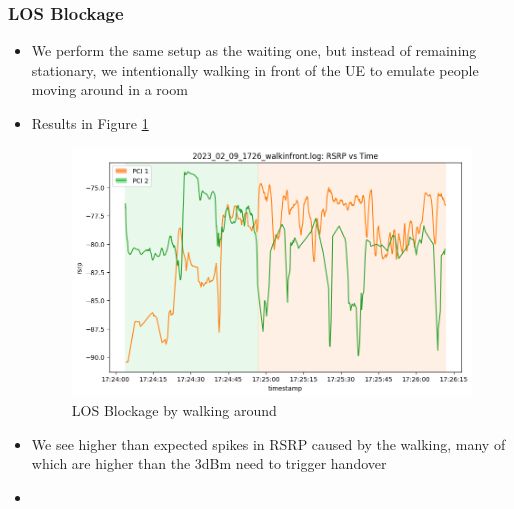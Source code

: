 \subsubsection{LOS Blockage}
\begin{itemize}
    \item We perform the same setup as the waiting one, but instead of remaining stationary, we intentionally walking in front of the UE to emulate people moving around in a room
    \item Results in Figure \ref{fig:methods:2024-02-09-walking}
\begin{figure}
    \centering
    \includegraphics[width=0.75\linewidth]{src//img/2024_02_09_los_block.png}
    \caption{LOS Blockage by walking around}
    \label{fig:methods:2024-02-09-walking}
\end{figure}

\item We see higher than expected spikes in RSRP caused by the walking, many of which are higher than the 3dBm need to trigger handover
\item \end{itemize}